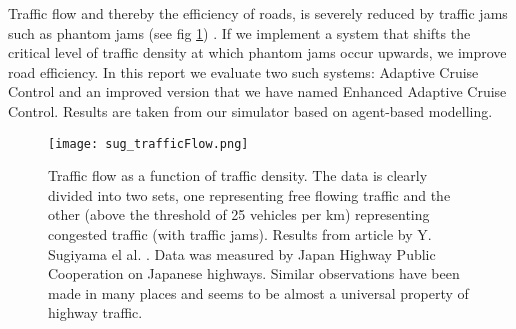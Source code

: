 Traffic flow and thereby the efficiency of roads, is severely reduced by
traffic jams such as phantom jams (see fig \ref{sug_flow}) \cite{sugiyama}. If we implement a system that shifts the critical level of traffic density at which phantom jams occur upwards, we improve road efficiency. In this report we evaluate two such systems: Adaptive Cruise Control and an improved version that we have named Enhanced Adaptive Cruise Control. Results are taken from our simulator based on agent-based modelling.

\begin{figure}[H]
    \begin{center}
    \texttt{[image: sug\_trafficFlow.png]}
    \caption{\label{sug_flow}
Traffic flow as a function of traffic density. The data is clearly divided
into two sets, one representing free flowing traffic and the other (above the
threshold of 25 vehicles per km) representing congested traffic (with traffic
jams).  Results from article by Y. Sugiyama el al. \cite{sugiyama}.  Data was
measured by Japan Highway Public Cooperation on Japanese highways. Similar
observations have been made in many places and seems to be almost a universal
property of highway traffic.}
    \end{center}
\end{figure}

